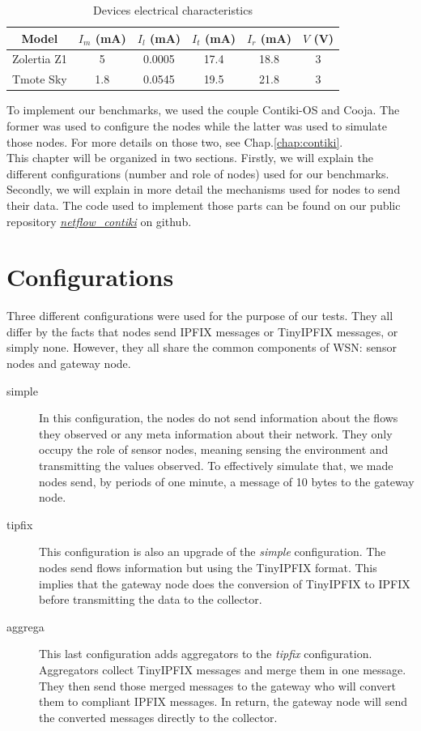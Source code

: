 \begin{table}
  \centering

  \begin{tabular}{|c|c|c|c|c|c|}
    \hline
    Model & $I_m$ (mA) & $I_l$ (mA) & $I_t$ (mA) & $I_r$ (mA) & $V$ (V)\\
    \hline
    Zolertia Z1 & 5 & 0.0005 & 17.4 & 18.8 & 3 \\
    \hline
    Tmote Sky & 1.8 & 0.0545 & 19.5 & 21.8 & 3 \\
    \hline
  \end{tabular}
  \caption{Devices electrical characteristics}
  \label{table:device_consumption}
\end{table}

To implement our benchmarks, we used the couple Contiki-OS and Cooja. The former was used to configure the nodes while the latter was used to simulate those nodes. For more details on those two, see Chap.\ref{chap:contiki}.\\

This chapter will be organized in two sections. Firstly, we will explain the different configurations (number and role of nodes) used for our benchmarks. Secondly, we will explain in more detail the mechanisms used for nodes to send their data. The code used to implement those parts can be found on our public repository \textit{\href{https://github.com/edd19/netflow_contiki}{netflow\_contiki}} on github.

\section{Configurations}
Three different configurations were used for the purpose of our tests. They all differ by the facts that nodes send IPFIX messages or TinyIPFIX messages, or simply none. However, they all share the common components of WSN: sensor nodes and gateway node.

\begin{description}
  \item[simple] In this configuration, the nodes do not send information about the flows they observed or any meta information about their network. They only occupy the role of sensor nodes, meaning sensing the environment and transmitting the values observed. To effectively simulate that, we made nodes send, by periods of one minute, a message of 10 bytes to the gateway node.
  \item[tipfix] This configuration is also an upgrade of the \textit{simple} configuration. The nodes send flows information but using the TinyIPFIX format. This implies that the gateway node does the conversion of TinyIPFIX to IPFIX before transmitting the data to the collector.
  \item[aggrega] This last configuration adds aggregators to the \textit{tipfix} configuration. Aggregators collect TinyIPFIX messages and merge them in one message. They then send those merged messages to the gateway who will convert them to compliant IPFIX messages. In return, the gateway node will send the converted messages directly to the collector. \\
\end{description}

